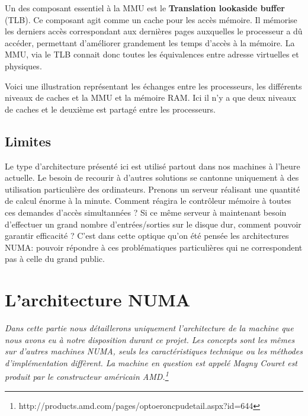       Un des composant essentiel à la MMU est le \textbf{Translation lookaside
        buffer} (TLB). Ce composant agit comme un cache pour les accès
      mémoire. Il mémorise les derniers accès correspondant aux dernières pages
      auxquelles le processeur a dû accéder, permettant d'améliorer grandement
      les temps d'accès à la mémoire. La MMU, via le TLB connait donc toutes les
      équivalences entre adresse virtuelles et physiques.

      Voici une illustration représentant les échanges entre les processeurs,
      les différents niveaux de caches et la MMU et la mémoire RAM. Ici il n'y a
      que deux niveaux de caches et le deuxième est partagé entre les
      processeurs.
    


    \subsection{Limites}
  
      Le type d'architecture présenté ici est utilisé partout dans nos machines
      à l'heure actuelle. Le besoin de recourir à d'autres solutions se cantonne
      uniquement à des utilisation particulière des ordinateurs. Prenons un
      serveur réalisant une quantité de calcul énorme à la minute. Comment
      réagira le contrôleur mémoire à toutes ces demandes d'accès simultannées ?
      Si ce même serveur à maintenant besoin d'effectuer un grand nombre
      d'entrées/sorties sur le disque dur, comment pouvoir garantir efficacité ?
      C'est dans cette optique qu'on été pensée les architectures NUMA: pouvoir
      répondre à ces problématiques particulières qui ne correspondent pas à
      celle du grand public.

\newpage

  \section{L'architecture NUMA}
    
    \textit{Dans cette partie nous détaillerons uniquement l'architecture de la
      machine que nous avons eu à notre disposition durant ce projet. Les
      concepts sont les mêmes sur d'autres machines NUMA, seuls les
      caractéristiques technique ou les méthodes d'implémentation diffèrent. La
      machine en question est appelé \og Magny Cour\fg et est produit par le
      constructeur américain
      AMD.\footnote{http://products.amd.com/pages/optoeroncpudetail.aspx?id=644}\newline}


